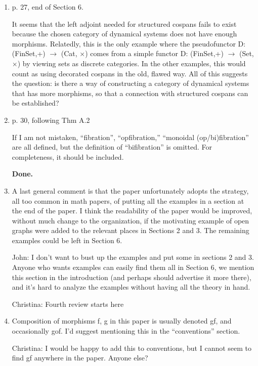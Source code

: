 \documentclass[reqno]{amsart}
\def\chris{\color{purple} Christina: }
\def\john{\color{red} John: }
\begin{document}
\begin{enumerate}
{\john That sounds plausible.  Unless there's a damn good reason let's use $f$ as a map for vertices and $g$ as a map for edges, since ``vertices come before edges'' - morally the first are 0-cells, the second are 1-cells.}

\item p. 27, end of Section 6.

It seems that the left adjoint needed for structured cospans fails to exist because the chosen category of dynamical systems does not have enough 
morphisms. Relatedly, this is the only example where the pseudofunctor D: (FinSet,+) $\to$ (Cat, $\times$) comes from a simple functor D: (FinSet,+) 
$\to$ (Set, $\times$) by viewing sets as discrete categories. In the other examples, this would count as using decorated cospans in the old, flawed 
way. 
All of this suggests the question: is there a way of constructing a category of dynamical systems that has more morphisms, so that a connection with 
structured cospans can be established?

\item p. 30, following Thm A.2

If I am not mistaken, “fibration”, “opfibration,” “monoidal (op/bi)fibration” are all defined, but the definition of “bifibration” is omitted. For 
completeness, it should be included.

{\bf Done.}

\item A last general comment is that the paper unfortunately adopts the strategy, all too common in math papers, of putting all the examples in a 
section at 
the end of the paper. I think the readability of the paper would be improved, without much change to the organization, if the motivating example of 
open graphs were added to the relevant places in Sections 2 and 3. The remaining examples could be left in Section 6.

{\john
I don't want to bust up the examples and put some in sections 2 and 3. Anyone who wants examples can easily find them all in Section 6, we mention 
this section in the introduction (and perhaps should advertise it more there), and it's hard to analyze the examples without having all the theory in 
hand.}


{\chris Fourth review starts here}
\item Composition of morphisms f, g in this paper is usually denoted gf, and occasionally gof. I’d suggest mentioning this in the “conventions” 
section.

{\chris I would be happy to add this to conventions, but I cannot seem to find gf anywhere in the paper. Anyone else?}


\end{enumerate}
\end{document}
